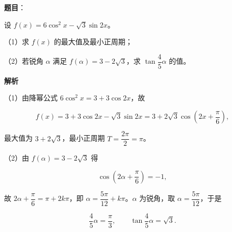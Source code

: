 \begin{answer}

\textbf{题目}：

设 $f(x)=6\cos^2x-\sqrt3\sin2x$。

（1）求 $f(x)$ 的最大值及最小正周期；

（2）若锐角 $\alpha$ 满足 $f(\alpha)=3-2\sqrt3$，求 $\tan\dfrac45\alpha$ 的值。

\textbf{解析}

（1）由降幂公式 $6\cos^2x=3+3\cos2x$，故

\nopagebreak[4]
\[f(x)=3+3\cos2x-\sqrt3\sin2x=3+2\sqrt3\cos\left(2x+\frac{\pi}6\right),\]

最大值为 $3+2\sqrt3$，最小正周期 $T=\dfrac{2\pi}2=\pi$。

（2）由 $f(\alpha)=3-2\sqrt3$ 得

\nopagebreak[4]
\[\cos\left(2\alpha+\frac{\pi}6\right)=-1,\]

故 $2\alpha+\dfrac{\pi}6=\pi+2k\pi$，即 $\alpha=\dfrac{5\pi}{12}+k\pi$。$\alpha$ 为锐角，取 $\alpha=\dfrac{5\pi}{12}$，于是

\nopagebreak[4]
\[\frac45\alpha=\frac{\pi}3,\qquad \tan\frac45\alpha=\sqrt3.\]


\end{answer}
